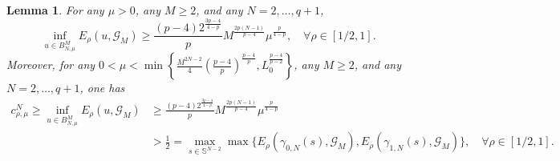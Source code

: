 \documentclass[11pt]{amsart}
\newtheorem{lemma}[theorem]{Lemma}
\newcommand{\G}{\mathcal{G}}
\numberwithin{equation}{section}
\begin{document}
\begin{lemma}\label{lem-window-lower}
For any $ \mu >0$, any $M \geq 2$, and any $N=2,\ldots,q+1$,
\begin{equation}\label{lower-shell}
\inf_{u\in B_{N,\mu}^M}E_\rho(u,\G_M)\geq \frac{(p-4)2^{\frac{3p-4}{4-p}}}{p}M^{\frac{2p(N-1)}{p-4}}\mu^{\frac{p}{4-p}},\quad \forall \rho\in[1/2,1].
\end{equation}
Moreover, for any $0<\mu<\min\left\{\frac{M^{2N-2}}{4}\left( \frac{p-4}{p} \right)^{\frac{p-4}{p}},L_0^\frac{p-4}{p-2}\right\}$, any $M\geq 2$, and any
$N=2,\ldots,q+1$, one has
\begin{equation}\label{eqlem55}
\begin{aligned}
c_{\rho,\mu}^N
\ge\inf_{u\in B_{N,\mu}^M}E_\rho(u,\G_M) &\geq  \frac{(p-4)2^{\frac{3p-4}{4-p}}}{p}M^{\frac{2p(N-1)}{p-4}}\mu^{\frac{p}{4-p}}\\
&>\frac{1}{2}= \max_{s \in \mathbb{S}^{N-2}}\max\{E_\rho(\gamma_{0,N}(s),\G_M),E_\rho(\gamma_{1,N}(s),\G_M)\},\quad \forall \rho\in[1/2,1].
\end{aligned}
\end{equation}
\end{lemma}
\end{document}
